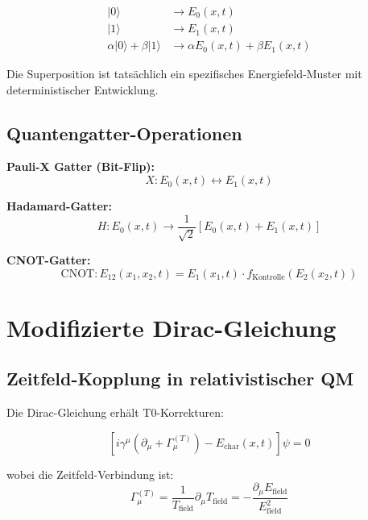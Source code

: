 \documentclass[12pt,a4paper]{report}
\begin{document}
	\begin{align}
		|0\rangle &\rightarrow E_0(x,t) \\
		|1\rangle &\rightarrow E_1(x,t) \\
		\alpha|0\rangle + \beta|1\rangle &\rightarrow \alpha E_0(x,t) + \beta E_1(x,t)
	\end{align}
	
	Die Superposition ist tatsächlich ein spezifisches Energiefeld-Muster mit deterministischer Entwicklung.
	
	\subsection{Quantengatter-Operationen}
	\label{subsec:quantum_gate_operations}
	
	\textbf{Pauli-X Gatter (Bit-Flip):}
	\begin{equation}
		X: E_0(x,t) \leftrightarrow E_1(x,t)
	\end{equation}
	
	\textbf{Hadamard-Gatter:}
	\begin{equation}
		H: E_0(x,t) \rightarrow \frac{1}{\sqrt{2}}[E_0(x,t) + E_1(x,t)]
	\end{equation}
	
	\textbf{CNOT-Gatter:}
	\begin{equation}
		\text{CNOT}: E_{12}(x_1,x_2,t) = E_1(x_1,t) \cdot f_{\text{Kontrolle}}(E_2(x_2,t))
	\end{equation}
	
	\section{Modifizierte Dirac-Gleichung}
	\label{sec:modified_dirac}
	
	\subsection{Zeitfeld-Kopplung in relativistischer QM}
	\label{subsec:dirac_time_field}
	
	Die Dirac-Gleichung erhält T0-Korrekturen:
	
	\begin{equation}
		\left[i\gamma^\mu\left(\partial_\mu + \Gamma_\mu^{(T)}\right) - E_{\text{char}}(x,t)\right]\psi = 0
	\end{equation}
	
	wobei die Zeitfeld-Verbindung ist:
	\begin{equation}
		\Gamma_\mu^{(T)} = \frac{1}{T_{\text{field}}} \partial_\mu T_{\text{field}} = -\frac{\partial_\mu E_{\text{field}}}{E_{\text{field}}^2}
	\end{equation}
	
\end{document}
